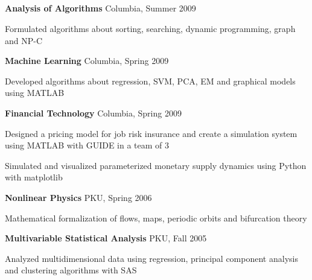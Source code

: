 \documentclass[margin,line]{resume}
\begin{document}
\begin{resume}
    \section{\mysidestyle [Algorithm]}

    \textbf{Analysis of Algorithms} \hfill Columbia, Summer 2009 \vspace{-3mm}\\\vspace{-1mm}%
      \begin{list2}
      \item Formulated algorithms about sorting, searching, dynamic programming, graph and NP-C
      \end{list2}
    
    \textbf{Machine Learning} \hfill Columbia, Spring 2009 \vspace{-3mm}\\\vspace{-1mm}%
      \begin{list2}
      \item Developed algorithms about regression, SVM, PCA, EM and graphical models using MATLAB 
      \end{list2}

    \textbf{Financial Technology} \hfill Columbia, Spring 2009 \vspace{-3mm}\\\vspace{-1mm}%
      \begin{list2}
      \item Designed a pricing model for job risk insurance and create a simulation system using MATLAB with GUIDE in a team of 3 
      \item Simulated and visualized parameterized monetary supply dynamics using Python with matplotlib 
      \end{list2}

    \textbf{Nonlinear Physics} \hfill PKU, Spring 2006  \vspace{-3mm}\\\vspace{-1mm}%
      \begin{list2}
      \item Mathematical formalization of flows, maps, periodic orbits and bifurcation theory 
      \end{list2}

    \textbf{Multivariable Statistical Analysis} \hfill PKU, Fall 2005  \vspace{-3mm}\\\vspace{-1mm}%
      \begin{list2}
       \item Analyzed multidimensional data using regression, principal component analysis and clustering algorithms with SAS
      \end{list2}


\end{resume}
\end{document}
